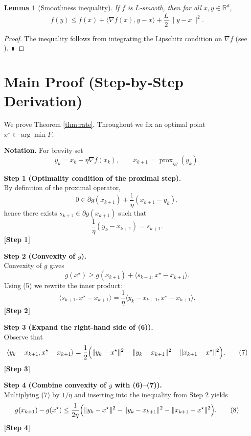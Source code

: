 \documentclass{article}
\newtheorem{lemma}{Lemma}
\newcommand{\prox}{\operatorname{prox}}
\newcommand{\R}{\mathbb{R}}
\begin{document}
\begin{lemma}[Smoothness inequality]\label{lem:smooth}
If $f$ is $L$‑smooth, then for all $x,y\in\R^{d}$,
\[
f(y)\le f(x)+\langle\nabla f(x),y-x\rangle+\frac{L}{2}\|y-x\|^{2}.
\tag{4}
\]
\end{lemma}
\begin{proof}
The inequality follows from integrating the Lipschitz condition on $\nabla f$ (see \cite{nesterov2004}). ∎
\end{proof}

\section*{Main Proof (Step‑by‑Step Derivation)}
We prove Theorem \ref{thm:rate}. Throughout we fix an optimal point $x^{\star}\in\arg\min F$.

\noindent\textbf{Notation.} For brevity set 
\[
y_{k}=x_{k}-\eta\nabla f(x_{k}),\qquad
x_{k+1}= \prox_{\eta g}(y_{k}) .
\]

\noindent\textbf{Step 1 (Optimality condition of the proximal step).}\\
By definition of the proximal operator,
\[
0\in \partial g(x_{k+1})+\frac{1}{\eta}(x_{k+1}-y_{k}),
\]
hence there exists $s_{k+1}\in\partial g(x_{k+1})$ such that
\begin{equation}
\frac{1}{\eta}(y_{k}-x_{k+1})=s_{k+1}.
\tag{5}
\end{equation}
\textbf{[Step 1]}

\noindent\textbf{Step 2 (Convexity of $g$).}\\
Convexity of $g$ gives
\[
g(x^{\star})\ge g(x_{k+1})+\langle s_{k+1},x^{\star}-x_{k+1}\rangle .
\]
Using (5) we rewrite the inner product:
\[
\langle s_{k+1},x^{\star}-x_{k+1}\rangle
= \frac{1}{\eta}\langle y_{k}-x_{k+1},x^{\star}-x_{k+1}\rangle .
\tag{6}
\]
\textbf{[Step 2]}

\noindent\textbf{Step 3 (Expand the right‑hand side of (6)).}\\
Observe that
\[
\langle y_{k}-x_{k+1},x^{\star}-x_{k+1}\rangle
= \frac{1}{2}\Bigl(\|y_{k}-x^{\star}\|^{2}
-\|y_{k}-x_{k+1}\|^{2}
-\|x_{k+1}-x^{\star}\|^{2}\Bigr).
\tag{7}
\]
\textbf{[Step 3]}

\noindent\textbf{Step 4 (Combine convexity of $g$ with (6)–(7)).}\\
Multiplying (7) by $1/\eta$ and inserting into the inequality from Step 2 yields
\[
g(x_{k+1})-g(x^{\star})
\le \frac{1}{2\eta}\Bigl(
\|y_{k}-x^{\star}\|^{2}
-\|y_{k}-x_{k+1}\|^{2}
-\|x_{k+1}-x^{\star}\|^{2}
\Bigr).
\tag{8}
\]
\textbf{[Step 4]}
\end{document}
